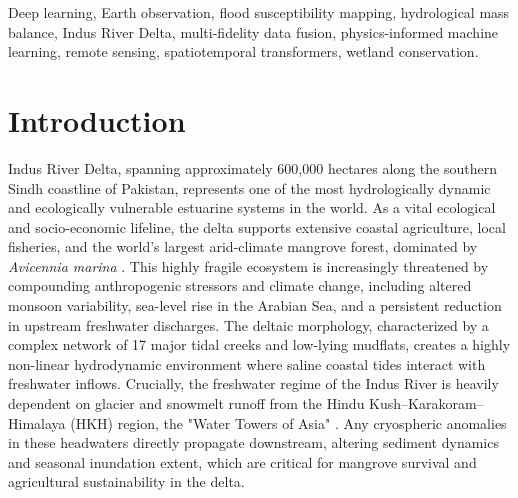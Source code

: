 \documentclass[journal]{IEEEtran}
\begin{document}
\begin{IEEEkeywords}
Deep learning, Earth observation, flood susceptibility mapping, hydrological mass balance, Indus River Delta, multi-fidelity data fusion, physics-informed machine learning, remote sensing, spatiotemporal transformers, wetland conservation.
\end{IEEEkeywords}

\section{Introduction}
 Indus River Delta, spanning approximately 600,000 hectares along the southern Sindh coastline of Pakistan, represents one of the most hydrologically dynamic and ecologically vulnerable estuarine systems in the world. As a vital ecological and socio-economic lifeline, the delta supports extensive coastal agriculture, local fisheries, and the world's largest arid-climate mangrove forest, dominated by \textit{Avicennia marina} \cite{haider_gridded_2025, nanditha_pakistan_2023, bazai_exploring_2025}. This highly fragile ecosystem is increasingly threatened by compounding anthropogenic stressors and climate change, including altered monsoon variability, sea-level rise in the Arabian Sea, and a persistent reduction in upstream freshwater discharges. The deltaic morphology, characterized by a complex network of 17 major tidal creeks and low-lying mudflats, creates a highly non-linear hydrodynamic environment where saline coastal tides interact with freshwater inflows. Crucially, the freshwater regime of the Indus River is heavily dependent on glacier and snowmelt runoff from the Hindu Kush--Karakoram--Himalaya (HKH) region, the "Water Towers of Asia" \cite{immerzeel_science_2010, lutz_consistent_2014, arshad_anthropogenic_2025}. Any cryospheric anomalies in these headwaters directly propagate downstream, altering sediment dynamics and seasonal inundation extent, which are critical for mangrove survival and agricultural sustainability in the delta.
\end{document}
